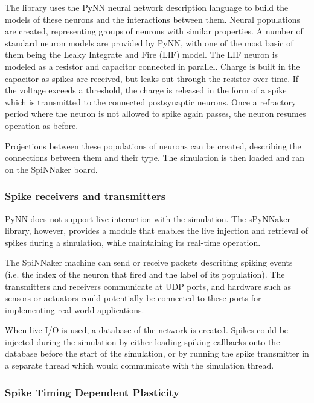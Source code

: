 \documentclass[10pt]{article}
\begin{document}
    The library uses the PyNN neural network description language to build the models of these neurons and the interactions between them. Neural populations are created, representing groups of neurons with similar properties. A number of standard neuron models are provided by PyNN, with one of the most basic of them being the Leaky Integrate and Fire (LIF) model. The LIF neuron is modeled as a resistor and capacitor connected in parallel. Charge is built in the capacitor as spikes are received, but leaks out through the resistor over time. If the voltage exceeds a threshold, the charge is released in the form of a spike which is transmitted to the connected postsynaptic neurons. Once a refractory period where the neuron is not allowed to spike again passes, the neuron resumes operation as before. 
    
    Projections between these populations of neurons can be created, describing the connections between them and their type. The simulation is then loaded and ran on the SpiNNaker board.

    \subsubsection{Spike receivers and transmitters}

    PyNN does not support live interaction with the simulation. The sPyNNaker library, however, provides a module that enables the live injection and retrieval of spikes during a simulation, while maintaining its real-time operation.

    The SpiNNaker machine can send or receive packets describing spiking events (i.e. the index of the neuron that fired and the label of its population). The transmitters and receivers communicate at UDP ports, and hardware such as sensors or actuators could potentially be connected to these ports for implementing real world applications.

    When live I/O is used, a database of the network is created. Spikes could be injected during the simulation by either loading spiking callbacks onto the database before the start of the simulation, or by running the spike transmitter in a separate thread which would communicate with the simulation thread.

    \subsubsection{Spike Timing Dependent Plasticity}
\end{document}
